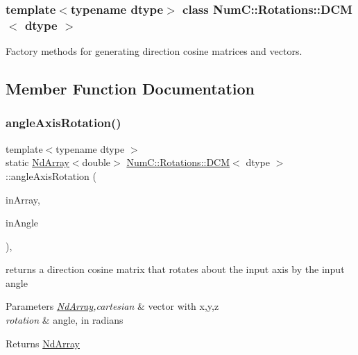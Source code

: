 \subsubsection*{template$<$typename dtype$>$\newline
class Num\+C\+::\+Rotations\+::\+D\+C\+M$<$ dtype $>$}

Factory methods for generating direction cosine matrices and vectors. 

\subsection{Member Function Documentation}
\mbox{\label{class_num_c_1_1_rotations_1_1_d_c_m_aa5736c3ede04e8efa2bd3bb84ded577e}} 
\subsubsection{\texorpdfstring{angle\+Axis\+Rotation()}{angleAxisRotation()}}
{\footnotesize\ttfamily template$<$typename dtype $>$ \\
static \mbox{\hyperlink{class_num_c_1_1_nd_array}{Nd\+Array}}$<$double$>$ \mbox{\hyperlink{class_num_c_1_1_rotations_1_1_d_c_m}{Num\+C\+::\+Rotations\+::\+D\+CM}}$<$ dtype $>$\+::angle\+Axis\+Rotation (\begin{DoxyParamCaption}\item[{const \mbox{\hyperlink{class_num_c_1_1_nd_array}{Nd\+Array}}$<$ dtype $>$ \&}]{in\+Array,  }\item[{double}]{in\+Angle }\end{DoxyParamCaption})\hspace{0.3cm}{\ttfamily [inline]}, {\ttfamily [static]}}

returns a direction cosine matrix that rotates about the input axis by the input angle


\begin{DoxyParams}{Parameters}
{\em \mbox{\hyperlink{class_num_c_1_1_nd_array}{Nd\+Array}},cartesian} & vector with x,y,z \\
\hline
{\em rotation} & angle, in radians \\
\hline
\end{DoxyParams}
\begin{DoxyReturn}{Returns}
\mbox{\hyperlink{class_num_c_1_1_nd_array}{Nd\+Array}} 
\end{DoxyReturn}
\mbox{\label{class_num_c_1_1_rotations_1_1_d_c_m_a2c328ea5549a2a222d8bd3e320caa40a}} 
